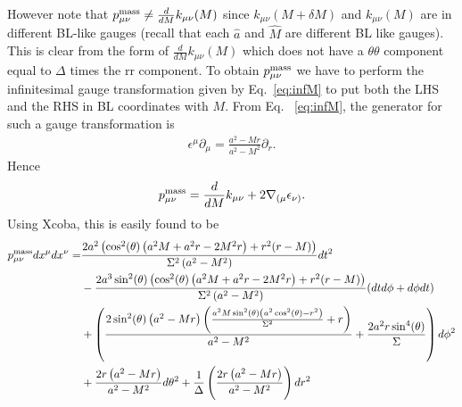 \documentclass[aps,prd,amsmath,showpacs,amssymb,superscriptaddress,nofootinbib,longbibliography,eqsecnum,preprintnumbers]{revtex4-1}
\begin{document}
However note that $p_{\mu\nu}^{\rm mass}\neq\frac{d}{dM}k_{\mu\nu}(M)$ since $k_{\mu\nu}(M+\delta M)$ and $k_{\mu\nu}(M)$ are in different BL-like gauges (recall that each $\hat a$ and $\hat M$ are different BL like gauges). This is clear from the form of $\frac{d}{dM}k_{\mu\nu}(M)$ which does not have a $\theta \theta$ component equal to $\Delta$ times the rr component. To obtain $p_{\mu\nu}^{\rm mass}$ we have to perform the infinitesimal gauge transformation given by Eq.~\eqref{eq:infM} to put both the LHS and the RHS in BL coordinates with $M$. From Eq. ~\eqref{eq:infM}, the generator for such a gauge transformation is
\begin{align}
\epsilon^\mu\partial_\mu =\frac{a^2-Mr}{a^2-M^2}\partial_r.
\end{align}
Hence
\begin{align}
p_{\mu\nu}^{\rm mass}=\frac{d}{dM}k_{\mu\nu}+2\nabla_{(\mu}\epsilon_{\nu)}.
\end{align}
Using Xcoba, this is easily found to be
\begin{align}
p_{\mu\nu}^{\rm mass}dx^\mu dx^\nu=
&\frac{2 a^2 \left(\cos ^2(\theta ) \left(a^2 M+a^2 r-2 M^2 r\right)+r^2 (r-M)\right)}{\Sigma ^2 \left(a^2-M^2\right)}dt^2 \nonumber \\
&-\frac{2 a^3 \sin ^2(\theta ) \left(\cos ^2(\theta ) \left(a^2 M+a^2 r-2 M^2 r\right)+r^2 (r-M)\right)}{\Sigma ^2 \left(a^2-M^2\right)}(dtd\phi+d\phi dt) \nonumber \\
&+\left(\frac{2 \sin ^2(\theta ) \left(a^2-M r\right) \left(\frac{a^2 M \sin ^2(\theta ) \left(a^2 \cos ^2(\theta )-r^2\right)}{\Sigma ^2}+r\right)}{a^2-M^2}+\frac{2 a^2 r \sin ^4(\theta )}{\Sigma } \right)d\phi^2 \nonumber \\
& +\frac{2 r \left(a^2-M r\right)}{a^2-M^2}d\theta^2+ \frac{1}{\Delta}\left(\frac{2 r \left(a^2-M r\right)}{a^2-M^2}\right) dr^2
\end{align}
\end{document}
